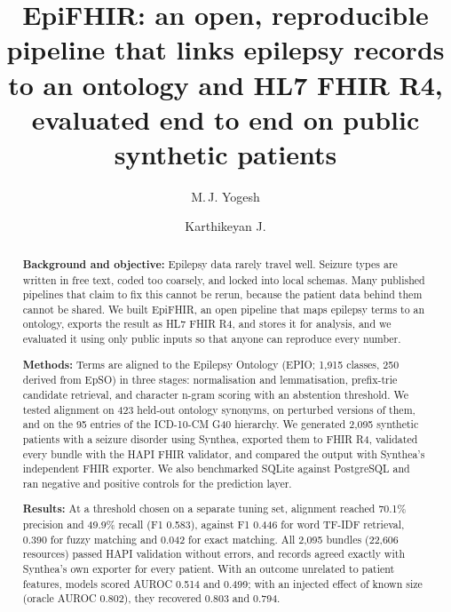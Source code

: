 \documentclass[preprint,12pt]{elsarticle}
\begin{document}
\begin{frontmatter}

\title{EpiFHIR: an open, reproducible pipeline that links epilepsy records to an ontology and HL7 FHIR R4, evaluated end to end on public synthetic patients}

\author[vit]{M.\,J. Yogesh}
\author[vit]{Karthikeyan J.}

\begin{abstract}
\noindent\textbf{Background and objective:} Epilepsy data rarely travel well. Seizure types are written in free text, coded too coarsely, and locked into local schemas. Many published pipelines that claim to fix this cannot be rerun, because the patient data behind them cannot be shared. We built EpiFHIR, an open pipeline that maps epilepsy terms to an ontology, exports the result as HL7 FHIR R4, and stores it for analysis, and we evaluated it using only public inputs so that anyone can reproduce every number.

\noindent\textbf{Methods:} Terms are aligned to the Epilepsy Ontology (EPIO; 1,915 classes, 250 derived from EpSO) in three stages: normalisation and lemmatisation, prefix-trie candidate retrieval, and character n-gram scoring with an abstention threshold. We tested alignment on 423 held-out ontology synonyms, on perturbed versions of them, and on the 95 entries of the ICD-10-CM G40 hierarchy. We generated 2,095 synthetic patients with a seizure disorder using Synthea, exported them to FHIR R4, validated every bundle with the HAPI FHIR validator, and compared the output with Synthea's independent FHIR exporter. We also benchmarked SQLite against PostgreSQL and ran negative and positive controls for the prediction layer.

\noindent\textbf{Results:} At a threshold chosen on a separate tuning set, alignment reached 70.1\% precision and 49.9\% recall (F1 0.583), against F1 0.446 for word TF-IDF retrieval, 0.390 for fuzzy matching and 0.042 for exact matching. All 2,095 bundles (22,606 resources) passed HAPI validation without errors, and records agreed exactly with Synthea's own exporter for every patient. With an outcome unrelated to patient features, models scored AUROC 0.514 and 0.499; with an injected effect of known size (oracle AUROC 0.802), they recovered 0.803 and 0.794.


\end{abstract}
\end{frontmatter}
\end{document}
